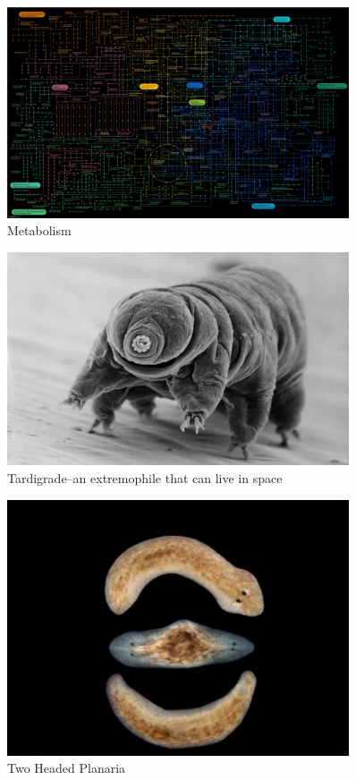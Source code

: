 \documentclass[]{article}
\begin{document}
\begin{figure}[H]
	\caption{Metabolism}\label{fig:metabolism}
	\includegraphics[width=0.9\textwidth]{Metabolism}
\end{figure}

\begin{figure}[H]
	\caption{Tardigrade--an extremophile that can live in space}\label{fig:tardigrade}
	\includegraphics[width=0.9\textwidth]{Tardigrade}
\end{figure}


\begin{figure}[H]
	\caption{Two Headed Planaria}\label{fig:2headed:planaria}
	\includegraphics[width=0.9\textwidth]{TwoHeadedPlanaria}
\end{figure}
\end{document}
